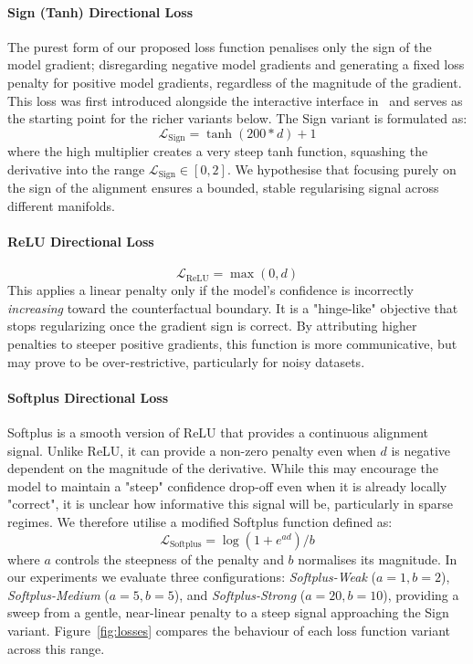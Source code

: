\paragraph{Sign (Tanh) Directional Loss}
The purest form of our proposed loss function penalises only the sign of the model gradient; disregarding negative model gradients and generating a fixed loss penalty for positive model gradients, regardless of the magnitude of the gradient. This loss was first introduced alongside the interactive interface in~\cite{erskine2024ijcai} and serves as the starting point for the richer variants below.
The Sign variant is formulated as:
\begin{equation}
    \mathcal{L}_{\text{Sign}} = \tanh(200*d) + 1
\end{equation}
where the high multiplier creates a very steep tanh function, squashing the derivative into the range $\mathcal{L}_{\text{Sign}} \in [0,2]$. We hypothesise that focusing purely on the sign of the alignment ensures a bounded, stable regularising signal across different manifolds.


\paragraph{ReLU Directional Loss}
\begin{equation}
    \mathcal{L}_{\text{ReLU}} = \max(0, d)
\end{equation}
This applies a linear penalty only if the model's confidence is incorrectly \emph{increasing} toward the counterfactual boundary. It is a "hinge-like" objective that stops regularizing once the gradient sign is correct. By attributing higher penalties to steeper positive gradients, this function is more communicative, but may prove to be over-restrictive, particularly for noisy datasets.

\paragraph{Softplus Directional Loss}
Softplus is a smooth version of ReLU that provides a continuous alignment signal. Unlike ReLU, it can provide a non-zero penalty even when $d$ is negative dependent on the magnitude of the derivative. While this may encourage the model to maintain a "steep" confidence drop-off even when it is already locally "correct", it is unclear how informative this signal will be, particularly in sparse regimes. We therefore utilise a modified Softplus function defined as:
\begin{equation}
    \mathcal{L}_{\text{Softplus}} = \log(1 + e^{ad})/b
\end{equation}
where $a$ controls the steepness of the penalty and $b$ normalises its magnitude. In our experiments we evaluate three configurations: \emph{Softplus-Weak} ($a=1, b=2$), \emph{Softplus-Medium} ($a=5, b=5$), and \emph{Softplus-Strong} ($a=20, b=10$), providing a sweep from a gentle, near-linear penalty to a steep signal approaching the Sign variant. Figure~\ref{fig:losses} compares the behaviour of each loss function variant across this range.


